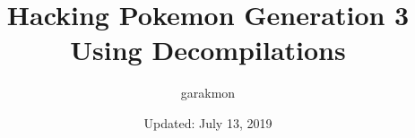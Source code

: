 \documentclass[11pt]{article}
\title{Hacking Pokemon Generation 3 Using Decompilations}
\author{garakmon}
\date{Updated: July 13, 2019}
\begin{document}

\maketitle

\vfill

\tableofcontents

\pagebreak

%
%
%
%





\end{document}
